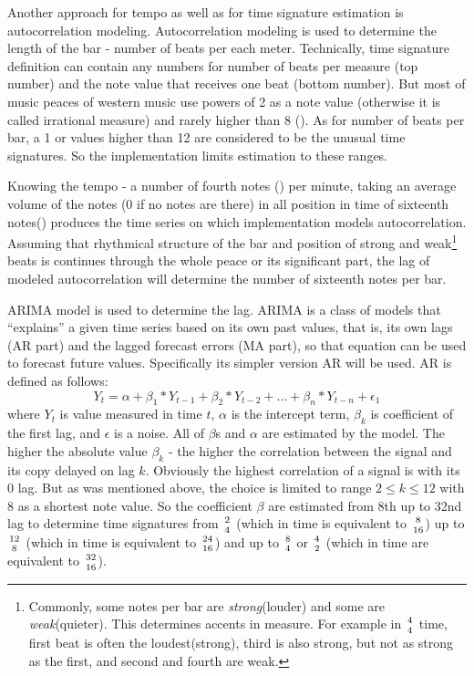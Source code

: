 Another approach for tempo as well as for time signature estimation is autocorrelation modeling. Autocorrelation
modeling is used to determine the length of the bar - number of beats per each meter. Technically, time signature
definition can contain any numbers for number of beats per measure (top number) and the note value that receives one
beat (bottom number). But most of music peaces of western music use powers of 2 as a note value (otherwise it is called
irrational measure) and rarely higher than 8 (\AAcht). As for number of beats per bar, a 1 or values higher than 12 are
considered to be the unusual time signatures. So the implementation limits estimation to these ranges.

Knowing the tempo - a number of fourth notes (\Vier) per minute, taking an average volume of the notes (0 if no notes
are there) in all position in time of sixteenth notes(\Sech) produces the time series on which implementation models
autocorrelation. Assuming that rhythmical structure of the bar and position of strong and weak\footnote{Commonly, some
notes per bar are \textit{strong}(louder) and some are \textit{weak}(quieter). This determines accents in measure. For
example in $4\atop4$ time, first beat is often the loudest(strong), third is also strong, but not as strong as
the first, and second and fourth are weak.} beats is continues through the whole peace or its significant part, the lag
of modeled autocorrelation will determine the number of sixteenth notes per bar.

\ac{ARIMA} model is used to determine the lag. \ac{ARIMA} is a class of models that ``explains'' a given time series
based on its own past values, that is, its own lags (AR part) and the lagged forecast errors (MA part), so that equation
can be used to forecast future values. Specifically its simpler version AR will be used. AR is defined as follows:
\[ Y_t = \alpha + \beta_1*Y_{t-1} + \beta_2*Y_{t-2} + \dots + \beta_n*Y_{t-n} + \epsilon_1 \]
where $Y_t$ is value measured in time $t$, $\alpha$ is the intercept term, $\beta_k$ is coefficient of the first lag,
and $\epsilon$ is a noise. All of $\beta$s and $\alpha$ are estimated by the model. The higher the absolute value
$\beta_k$ - the higher the correlation between the signal and its copy delayed on lag $k$. Obviously the highest
correlation of a signal is with its 0 lag. But as was mentioned above, the choice is limited to range $2 \le k \le 12$
with 8 as a shortest note value. So the coefficient $\beta$ are estimated from 8th up to 32nd lag to determine time
signatures from $2\atop4$ (which in time is equivalent to $8\atop16$) up to $12\atop8$ (which in time is equivalent to
$24\atop16$) and up to $8\atop4$ or $4\atop2$ (which in time are equivalent to $32\atop16$).

